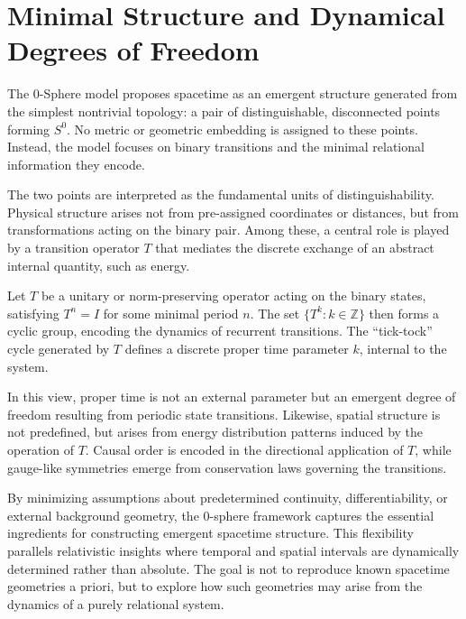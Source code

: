 \documentclass[%
 reprint,
 amsmath,amssymb,
 aps,
]{revtex4-1}
\numberwithin{equation}{section}%
\begin{document}
\section{Minimal Structure and Dynamical Degrees of Freedom}
\label{sec:minimal_structure}

The 0-Sphere model proposes spacetime as an emergent structure generated from the simplest nontrivial topology: a pair of distinguishable, disconnected points forming $S^0$. No metric or geometric embedding is assigned to these points. Instead, the model focuses on binary transitions and the minimal relational information they encode.

The two points are interpreted as the fundamental units of distinguishability. Physical structure arises not from pre-assigned coordinates or distances, but from transformations acting on the binary pair. Among these, a central role is played by a transition operator $T$ that mediates the discrete exchange of an abstract internal quantity, such as energy.

Let $T$ be a unitary or norm-preserving operator acting on the binary states, satisfying $T^n = I$ for some minimal period $n$. The set $\{T^k : k \in \mathbb{Z}\}$ then forms a cyclic group, encoding the dynamics of recurrent transitions. The ``tick-tock'' cycle generated by $T$ defines a discrete proper time parameter $k$, internal to the system.

In this view, proper time is not an external parameter but an emergent degree of freedom resulting from periodic state transitions. Likewise, spatial structure is not predefined, but arises from energy distribution patterns induced by the operation of $T$. Causal order is encoded in the directional application of $T$, while gauge-like symmetries emerge from conservation laws governing the transitions.

By minimizing assumptions about predetermined continuity, differentiability, or external background geometry, the 0-sphere framework captures the essential ingredients for constructing emergent spacetime structure. This flexibility parallels relativistic insights where temporal and spatial intervals are dynamically determined rather than absolute. The goal is not to reproduce known spacetime geometries a priori, but to explore how such geometries may arise from the dynamics of a purely relational system.
\end{document}
